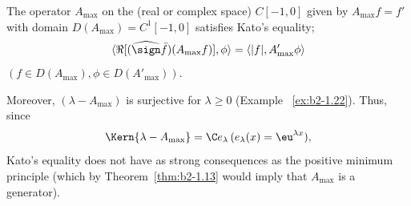 \begin{example}\label{ex:b2-2.12}
The operator $A_{\max}$ on the (real or complex space) $C[-1,0]$ given by $A_{\max}f = f'$ with domain $D(A_{\max}) = C^{1}[-1,0]$ satisfies Kato's equality; \ie 
\begin{equation}\label{eq:b2-2.16}
\langle \Re[(\widehat{\sign} \bar{f})(A_{\max}f)],\phi \rangle = \langle |f|,A'_{\max}\phi \rangle
\end{equation}
$(f \in D(A_{\max}), \phi \in D(A'_{\max}))$.

Moreover, $(\lambda - A_{\max})$ is surjective for $\lambda \geq 0$ (\cf Example ~\ref{ex:b2-1.22}).
Thus, since 
\[
	\Kern{\lambda - A_{\max}} = \C e_{\lambda} \, (e_{\lambda}(x) = \eu^{\lambda x}), 
\]
Kato's equality does not have as strong consequences as the positive minimum principle (which by Theorem~\ref{thm:b2-1.13} would imply that $A_{\max}$ is a generator).
\end{example}

